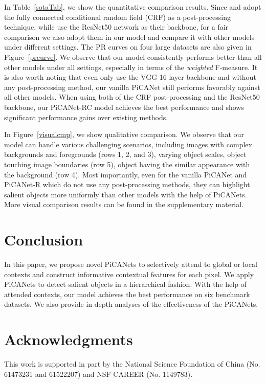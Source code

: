 \documentclass[10pt,twocolumn,letterpaper]{article}
\begin{document}
In Table~\ref{sotaTab}, we show the quantitative comparison results. Since \cite{li2016dcl} and \cite{hou2017dss} adopt the fully connected conditional random field (CRF) \cite{krahenbuhl2011crf} as a post-processing technique, while \cite{Wang2017srm} use the ResNet50 \cite{he2016resnet} network as their backbone, for a fair comparison we also adopt them in our model and compare it with other models under different settings. The PR curves on four large datasets are also given in Figure~\ref{prcurve}. We observe that our model consistently performs better than all other models under all settings, especially in terms of the \emph{weighted} F-measure. It is also worth noting that even only use the VGG 16-layer backbone and without any post-processing method, our vanilla PiCANet still performs favorably against all other models. When using both of the CRF post-processing and the ResNet50 backbone, our PiCANet-RC model achieves the best performance and shows significant performance gains over existing methods.

In Figure~\ref{visualcmp}, we show qualitative comparison. We observe that our model can handle various challenging scenarios, including images with complex backgrounds and foregrounds (rows 1, 2, and 3), varying object scales, object touching image boundaries (row 5), object having the similar appearance with the background (row 4). Most importantly, even for the vanilla PiCANet and PiCANet-R which do not use any post-processing methods, they can highlight salient objects more uniformly than other models with the help of PiCANets. More visual comparison results can be found in the supplementary material.

\section{Conclusion}

In this paper, we propose novel PiCANets to selectively attend to global or local contexts and construct informative contextual features for each pixel. We apply PiCANets to detect salient objects in a hierarchical fashion. With the help of attended contexts, our model achieves the best performance on six benchmark datasets. We also provide in-depth analyses of the effectiveness of the PiCANets.

\section*{Acknowledgments}
%
This work is supported in part by the National Science Foundation of China (No. 61473231 and 61522207) and NSF CAREER (No. 1149783).

{\small


}
\end{document}

